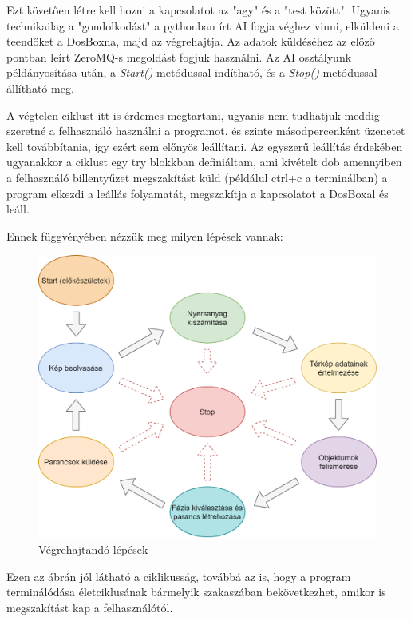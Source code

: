 Ezt követően létre kell hozni a kapcsolatot az "agy" és a "test között". Ugyanis technikailag a "gondolkodást" a pythonban írt AI fogja véghez vinni, elküldeni a teendőket a DosBoxna, majd az végrehajtja. Az adatok küldéséhez az előző pontban leírt
ZeroMQ-s megoldást fogjuk használni. Az AI osztályunk példányosítása után, a \textit{Start()} metódussal indítható, és a \textit{Stop()} metódussal állítható meg. 

A végtelen ciklust itt is érdemes megtartani, ugyanis nem tudhatjuk meddig szeretné a felhasználó használni a programot, és szinte másodpercenként üzenetet kell továbbítania, így ezért sem előnyös leállítani. Az egyszerű
leállítás érdekében ugyanakkor a ciklust egy try blokkban definiáltam, ami kivételt dob amennyiben a felhasználó billentyűzet megszakítást küld (példálul ctrl+c a terminálban) a program elkezdi a leállás folyamatát, megszakítja a kapcsolatot a DosBoxal és leáll.

Ennek függvényében nézzük meg milyen lépések vannak:

\begin{figure}[h]
    \centering
    \includegraphics[scale=0.4]{images/image0.png}
    \caption{Végrehajtandó lépések}
    \label{fig:lepesek}
\end{figure}

Ezen az ábrán jól látható a ciklikusság, továbbá az is, hogy a program terminálódása életciklusának bármelyik szakaszában bekövetkezhet, amikor is megszakítást kap a felhasználótól.

